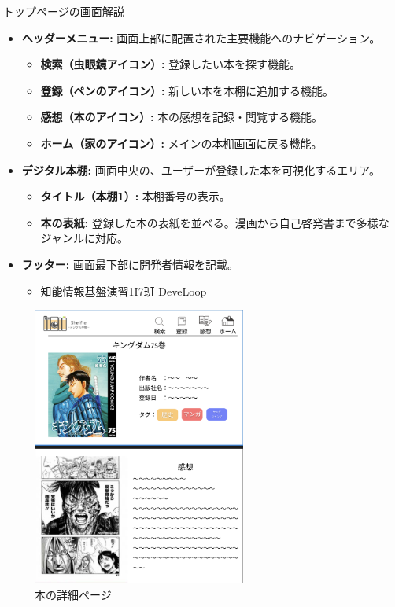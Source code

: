 \documentclass[a4paper, 11pt, titlepage]{jsarticle}
\begin{document}
トップページの画面解説
\begin{itemize}
    \item \textbf{ヘッダーメニュー:} 画面上部に配置された主要機能へのナビゲーション。
    \begin{itemize}
        \item \textbf{検索（虫眼鏡アイコン）:} 登録したい本を探す機能。
        \item \textbf{登録（ペンのアイコン）:} 新しい本を本棚に追加する機能。
        \item \textbf{感想（本のアイコン）:} 本の感想を記録・閲覧する機能。
        \item \textbf{ホーム（家のアイコン）:} メインの本棚画面に戻る機能。
    \end{itemize}

    \item \textbf{デジタル本棚:} 画面中央の、ユーザーが登録した本を可視化するエリア。
    \begin{itemize}
        \item \textbf{タイトル（本棚1）:} 本棚番号の表示。
        \item \textbf{本の表紙:} 登録した本の表紙を並べる。漫画から自己啓発書まで多様なジャンルに対応。
    \end{itemize}

    \item \textbf{フッター:} 画面最下部に開発者情報を記載。
    \begin{itemize}
        \item 知能情報基盤演習1I7班 DeveLoop
    \end{itemize}
\end{itemize}
\clearpage
\begin{figure}[htbp]
\centering
\includegraphics[width=70mm]{detailpage.png}
\caption{本の詳細ページ}
\label{fig:func}
\end{figure}
\end{document}
